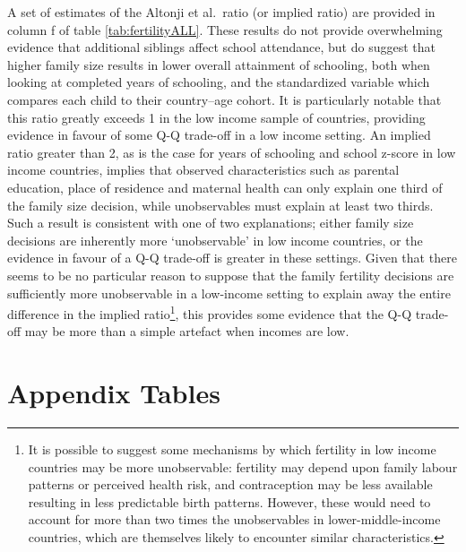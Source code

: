 \documentclass{article}[11pt,subeqn]
\begin{document}
\begin{spacing}{1.5}
A set of estimates of the Altonji et al.\ ratio (or implied ratio) are provided in column f of table \ref{tab:fertilityALL}.  These results do not provide overwhelming evidence
that additional siblings affect school attendance, but do suggest that higher family size results in lower overall attainment of schooling, both when looking at completed years 
of schooling, and the standardized variable which compares each child to their country--age cohort.  It is particularly notable that this ratio greatly exceeds 1 in the low
 income sample of countries, providing evidence in favour of some Q-Q trade-off in a low income setting.  An implied ratio greater than 2, as is the case for years of schooling 
and school z-score in low income countries, implies that observed characteristics such as parental education, place of residence and maternal health can only explain one third 
of the family size decision, while unobservables must explain at least two thirds.  Such a result is consistent with one of two explanations; either family size decisions are 
inherently more `unobservable' in low income countries, or the evidence in favour of a Q-Q trade-off is greater in these settings.  Given that there seems to be no particular 
reason to suppose that the family fertility decisions are sufficiently more unobservable in a low-income setting to explain away the entire difference in the implied ratio\footnote{It 
is possible to suggest some mechanisms by which fertility in low income countries may be more unobservable: fertility may depend upon family labour patterns or perceived 
health risk, and contraception may be less available resulting in less predictable birth patterns. However, these would need to account for more than two times the 
unobservables in lower-middle-income countries, which are themselves likely to encounter similar characteristics.}, this provides some evidence that the Q-Q trade-off may 
be more than a simple artefact when incomes are low. 

\newpage
\section{Appendix Tables}


\end{spacing}
\end{document}
